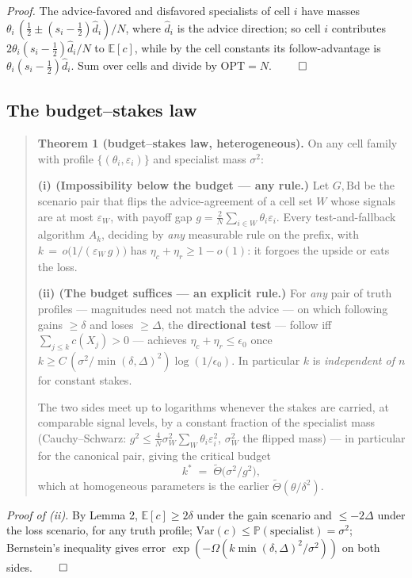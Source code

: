 \emph{Proof.} The advice-favored and disfavored specialists of cell
\(i\) have masses \(\theta_i\,(\tfrac12\pm(s_i-\tfrac12)\hat d_i)/N\),
where \(\hat d_i\) is the advice direction; so cell \(i\) contributes
\(2\theta_i(s_i-\tfrac12)\hat d_i/N\) to \(\mathbb E[c]\), while by the
cell constants its follow-advantage is
\(\theta_i(s_i-\tfrac12)\hat d_i\). Sum over cells and divide by
\(\mathrm{OPT}=N\). \(\qed\)

\subsection{The budget--stakes law}

\begin{quote}
\textbf{Theorem 1 (budget--stakes law, heterogeneous).} On any cell
family with profile \(\{(\theta_i,\varepsilon_i)\}\) and specialist mass
\(\sigma^2\):

\textbf{(i) (Impossibility below the budget --- any rule.)} Let
\(G,\mathrm{Bd}\) be the scenario pair that flips the advice-agreement
of a cell set \(W\) whose signals are at most \(\varepsilon_W\), with
payoff gap \(g=\tfrac2N\sum_{i\in W}\theta_i\varepsilon_i\). Every
test-and-fallback algorithm \(A_k\), deciding by \emph{any} measurable
rule on the prefix, with \(k \,=\, o\!\big(1/(\varepsilon_W\,g)\big)\)
has \(\eta_c+\eta_r \ge 1-o(1)\): it forgoes the upside or eats the
loss.

\textbf{(ii) (The budget suffices --- an explicit rule.)} For \emph{any}
pair of truth profiles --- magnitudes need not match the advice --- on
which following gains \(\ge\delta\) and loses \(\ge\Delta\), the
\textbf{directional test} --- follow iff \(\sum_{j\le k} c(X_j) > 0\)
--- achieves \(\eta_c+\eta_r \le \epsilon_0\) once
\(k \ge C\,(\sigma^2/\min(\delta,\Delta)^2)\log(1/\epsilon_0)\). In
particular \(k\) is \emph{independent of \(n\)} for constant stakes.

The two sides meet up to logarithms whenever the stakes are carried, at
comparable signal levels, by a constant fraction of the specialist mass
(Cauchy--Schwarz:
\(g^2 \le \tfrac4N\sigma^2_W\sum_W\theta_i\varepsilon_i^2\),
\(\sigma^2_W\) the flipped mass) --- in particular for the canonical
pair, giving the critical budget
\[k^* \;=\; \tilde\Theta\!\big(\sigma^2/g^2\big),\] which at homogeneous
parameters is the earlier \(\tilde\Theta(\theta/\delta^2)\).
\end{quote}

\emph{Proof of (ii).} By Lemma 2, \(\mathbb E[c] \ge 2\delta\) under the
gain scenario and \(\le -2\Delta\) under the loss scenario, for any
truth profile;
\(\mathrm{Var}(c) \le \mathbb P(\text{specialist}) = \sigma^2\);
Bernstein's inequality gives error
\(\exp(-\Omega(k\min(\delta,\Delta)^2/\sigma^2))\) on both sides.
\(\qed\)

